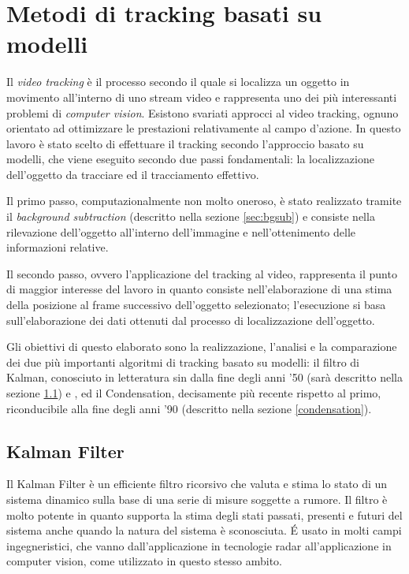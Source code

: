 ﻿\section{Metodi di tracking basati su modelli} \label{modelTracking}
Il \textit{video tracking} è il processo secondo il quale si localizza un oggetto in movimento all'interno di uno stream video e rappresenta uno dei più interessanti problemi di \textit{computer vision}. Esistono svariati approcci al video tracking, ognuno orientato ad ottimizzare le prestazioni relativamente al campo d'azione. In questo lavoro è stato scelto di effettuare il tracking secondo l'approccio basato su modelli, che viene eseguito secondo due passi fondamentali: la localizzazione dell'oggetto da tracciare ed il tracciamento effettivo.

Il primo passo, computazionalmente non molto oneroso, è stato realizzato tramite il \textit{background subtraction} (descritto nella sezione \ref{sec:bgsub}) e consiste nella rilevazione dell'oggetto all'interno dell'immagine e nell'ottenimento delle informazioni relative.

Il secondo passo, ovvero l'applicazione del tracking al video, rappresenta il punto di maggior interesse del lavoro in quanto consiste nell'elaborazione di una stima della posizione al frame successivo dell'oggetto selezionato; l'esecuzione si basa sull'elaborazione dei dati ottenuti dal processo di localizzazione dell'oggetto.

Gli obiettivi di questo elaborato sono la realizzazione, l'analisi e la comparazione dei due più importanti algoritmi di tracking basato su modelli: il filtro di Kalman, conosciuto in letteratura sin dalla fine degli anni '50 (sarà descritto nella sezione \ref{kalman}) e , ed il Condensation, decisamente più recente rispetto al primo, riconducibile alla fine degli anni '90 (descritto nella sezione \ref{condensation}).


\subsection{Kalman Filter}\label{kalman}
Il Kalman Filter\cite{kalman-intro} è un efficiente filtro ricorsivo che valuta e stima lo stato di un sistema dinamico sulla base di una serie di misure soggette a rumore. Il filtro è molto potente in quanto supporta la stima degli stati passati, presenti e futuri del sistema anche quando la natura del sistema è sconosciuta. \'E usato in molti campi ingegneristici, che vanno dall'applicazione in tecnologie radar all'applicazione in computer vision, come utilizzato in questo stesso ambito.
